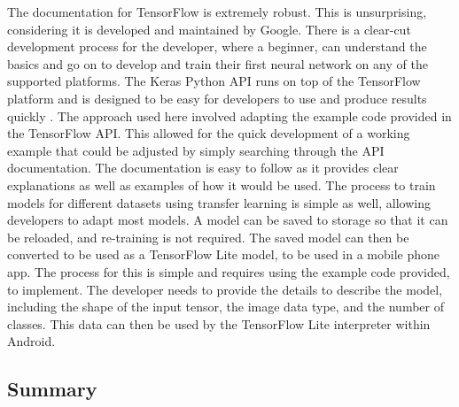\documentclass[12pt,a4paper]{report}
\begin{document}
\par

The documentation for TensorFlow is extremely robust. This is unsurprising, considering it is developed and maintained 
by Google. There is a clear-cut development process for the developer, where a beginner, can understand the basics and 
go on to develop and train their first neural network on any of the supported platforms. The Keras Python API runs on 
top of the TensorFlow platform and is designed to be easy for developers to use and produce results quickly 
\citep{kerasabout}. The approach used here involved adapting the example code provided in the TensorFlow API. This allowed
for the quick development of a working example that could be adjusted by simply searching through the API documentation. The 
documentation is easy to follow as it provides clear explanations as well as examples of how it would be used. The 
process to train models for different datasets using transfer learning is simple as well, allowing developers to adapt most
models. A model can be saved to storage so that it can be reloaded, and re-training is not required. The saved 
model can then be converted to be used as a TensorFlow Lite model, to be used in a mobile phone app. The process for this
is simple and requires using the example code provided, to implement. The developer needs to provide the 
details to describe the model, including the shape of the input tensor, the image data type, and the number of classes. 
This data can then be used by the TensorFlow Lite interpreter within Android.

\subsection{Summary}
\end{document}

